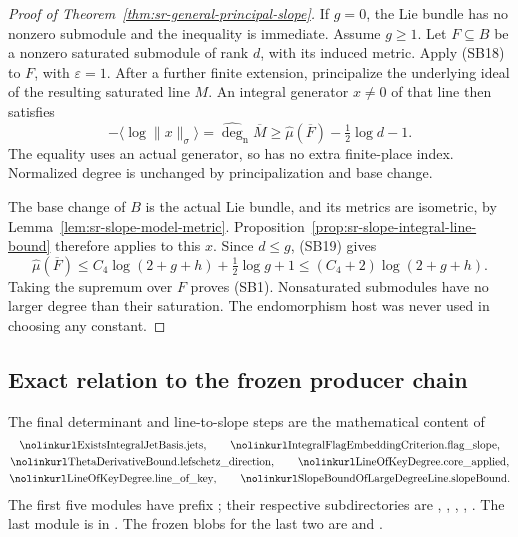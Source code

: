 \begin{proof}[Proof of Theorem~\ref{thm:sr-general-principal-slope}]
If \(g=0\), the Lie bundle has no nonzero
submodule and the inequality is immediate.
Assume \(g\ge1\).
Let \(F\subseteq B\) be a nonzero saturated
submodule of rank \(d\), with its induced
metric.
Apply (SB18) to \(F\), with
\(\varepsilon=1\).
After a further finite extension,
principalize the underlying ideal of the
resulting saturated line \(M\).
An integral generator \(x\ne0\) of that
line then satisfies
\[
 -\langle\log\|x\|_\sigma\rangle
       =\widehat{\deg}_{\mathrm n}\overline M
       \ge\widehat\mu(\overline F)
                                     -\tfrac12\log d-1. \tag{SB19}
\]
The equality uses an actual generator,
so has no extra finite-place index.
Normalized degree is unchanged by
principalization and base change.

The base change of \(B\) is the actual Lie
bundle, and its metrics are isometric,
by Lemma~\ref{lem:sr-slope-model-metric}.
Proposition~\ref{prop:sr-slope-integral-line-bound}
therefore applies to this \(x\).
Since \(d\le g\), (SB19) gives
\[
 \widehat\mu(\overline F)
       \le C_4\log(2+g+h)+\tfrac12\log g+1
       \le(C_4+2)\log(2+g+h).
\]
Taking the supremum over \(F\) proves (SB1).
Nonsaturated submodules have no larger
degree than their saturation.
The endomorphism host was never used in
choosing any constant.
\end{proof}

\subsection{Exact relation to the frozen producer chain}

The final determinant and line-to-slope
steps are the mathematical content of
\[
 \begin{gathered}
 \srcid{ExistsIntegralJetBasis.jets},\qquad
 \srcid{IntegralFlagEmbeddingCriterion.flag\_slope},\\
 \srcid{ThetaDerivativeBound.lefschetz\_direction},\qquad
 \srcid{LineOfKeyDegree.core\_applied},\\
 \srcid{LineOfKeyDegree.line\_of\_key},\qquad
 \srcid{SlopeBoundOfLargeDegreeLine.slopeBound}.
 \end{gathered}
\]
The first five modules have prefix
;
their respective subdirectories are
, ,
, ,
.
The last module is in
.
The frozen blobs for the last two are
and
.

